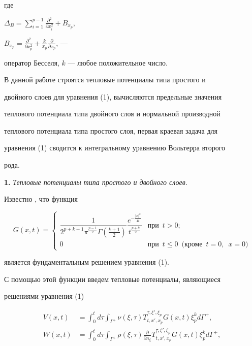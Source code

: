 где


$\Delta_B=\sum\limits^{p-1}_{i=1}\frac{\partial^2}{\partial x^2_i}+B_{x_p}$, 


$B_{x_p}=\frac{\partial^2}{\partial x^2_p}+\frac{k}{x_p} 


\frac{\partial}{\partial x_p}$, --- 


оператор Бесселя, $k$ --- любое положительное число. 


 


В данной работе строятся тепловые потенциалы типа простого и 


двойного слоев для уравнения (1), вычисляются предельные значения 


теплового потенциала типа двойного слоя и нормальной производной 


теплового потенциала типа простого слоя, первая краевая задача для 


уравнения (1) сводится к интегральному уравнению Вольтерра второго 


рода. 


\bigskip


 


{\bf 1.} {\it Тепловые потенциалы типа простого и двойного слоев.} 


Известно \cite{3}, что функция 


$$ 


G(x,t)= 


\begin{cases} 


\dfrac{1}{2^{p+k-1}\pi^{\frac{p-1}{2}}\Gamma\left(\frac{k+1}{2} 


\right)} \dfrac{e^{-\frac{|x|^2}{4t}}}{t^{\frac{p+k}{2}}} & 


\text{при} \ \; t>0;\\ 


0 & \text{при} \ \; t\le0 \ \; \text{(кроме} \ \; t=0,\ \;x=0) 


\end{cases} 


$$ 


является фундаментальным решением уравнения (1). 


 


С помощью этой функции введем тепловые потенциалы, являющиеся 


решениями уравнения (1) 


\begin{align*} 


V(x,t)&=\int^t_0 d\tau\int_{\Gamma^+}\nu(\xi,\tau) 


T^{\tau,\xi',\xi_p}_{t,x',x_p}G(x,t)\xi^k_p d\Gamma^+, \\ 


% 


W(x,t)&=\int^t_0 d\tau\int_{\Gamma^+}\rho(\xi,\tau) 


\frac{\partial}{\partial n_\xi} 


T^{\tau,\xi',\xi_p}_{t,x',x_p}G(x,t)\xi^k_p d\Gamma^+, 


\end{align*} 


